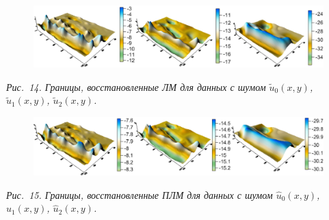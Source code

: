 \documentclass[10pt,pdf, mathserif, hyperref={unicode}]{beamer}
\begin{document}
\begin{frame}
	\begin{figure}
		\centering
		\includegraphics[height=0.2\textheight]{lm_noise}
	\end{figure}
	\centering\textit{Рис.~14. Границы, восстановленные ЛМ для данных с шумом $\tilde{u}_0(x,y)$, $\tilde{u}_1(x,y)$, $\tilde{u}_2(x,y)$.}
	\begin{figure}
		\centering
		\includegraphics[height=0.2\textheight]{clm_noise}
	\end{figure}
	\centering\textit{Рис.~15. Границы, восстановленные ПЛМ для данных с шумом $\hat{u}_0(x,y)$, $\hat{u}_1(x,y)$, $\hat{u}_2(x,y)$.}
\end{frame}
\end{document}
